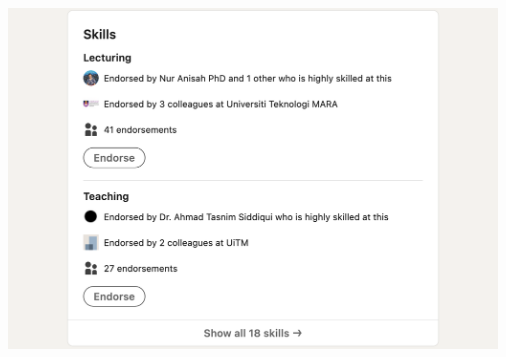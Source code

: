 \Continuing
\begin{center}
    \includegraphics[width=35em]{zakaria-linkedin-p4}
\end{center}

\pagebreak
